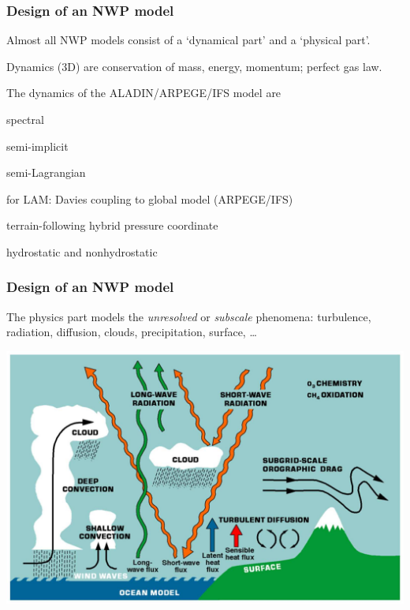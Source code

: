 \documentclass[aspectratio=43,9pt]{beamer}
\begin{document}
%
%
\begin{frame}
	\frametitle{Design of an NWP model}
	\begin{myitemize}{3ex}
		\item Almost all NWP models consist of a `dynamical part' and a `physical part'.
		\item Dynamics (3D) are conservation of mass, energy, momentum; perfect gas law.
		\item The dynamics of the ALADIN/ARPEGE/IFS model are
			\begin{myitemize}{1ex}
				\item spectral
				\item semi-implicit
				\item semi-Lagrangian
				\item for LAM: Davies coupling to global model (ARPEGE/IFS)
				\item terrain-following hybrid pressure coordinate
				\item hydrostatic and nonhydrostatic
			\end{myitemize}
	\end{myitemize}
\end{frame}
%
%
\begin{frame}
	\frametitle{Design of an NWP model}
	\begin{myitemize}{2ex}
		\item The physics part models the \emph{unresolved} or \emph{subscale} phenomena: turbulence, radiation, diffusion, clouds, precipitation, surface, \ldots
			\begin{center}
				\includegraphics[width=.7\textwidth]{physics}
			\end{center}
	\end{myitemize}
\end{frame}
\end{document}
